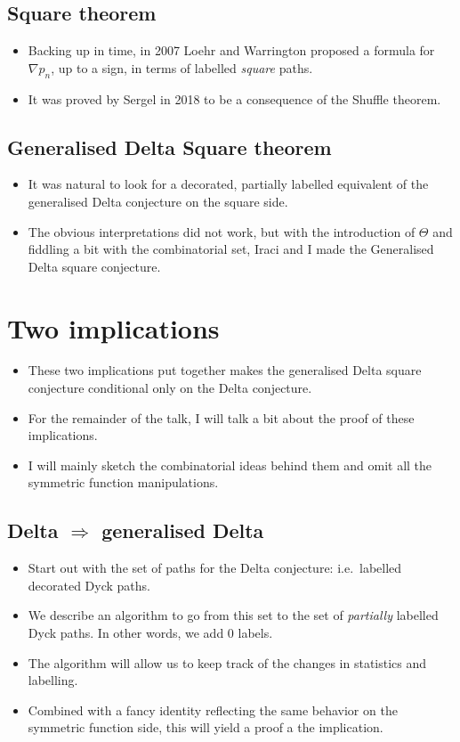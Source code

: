 \documentclass{article}
\begin{document}
\subsection{Square theorem}
\begin{itemize}
    \item Backing up in time, in 2007 Loehr and Warrington proposed a formula for $\nabla p_n$, up to a sign, in terms of labelled \emph{square} paths.
    \item It was proved by Sergel in 2018 to be a consequence of the Shuffle theorem.
\end{itemize}

\subsection{Generalised Delta Square theorem}
\begin{itemize}
    \item It was natural to look for a decorated, partially labelled equivalent of the generalised Delta conjecture on the square side. 
    \item The obvious interpretations did not work, but with the introduction of $\Theta$ and fiddling a bit with the combinatorial set, Iraci and I made the Generalised Delta square conjecture. 
\end{itemize}

\section{Two implications}
    \begin{itemize}
        \item These two implications put together makes the generalised Delta square conjecture conditional only on the Delta conjecture.
        \item For the remainder of the talk, I will talk a bit about the proof of these implications.
        \item I will mainly sketch the combinatorial ideas behind them and omit all the symmetric function manipulations.
    \end{itemize}

    \subsection{Delta $\Rightarrow$ generalised Delta}
        \begin{itemize}
            \item Start out with the set of paths for the Delta conjecture: i.e.\ labelled decorated Dyck paths. 
            \item We describe an algorithm to go from this set to the set of \emph{partially} labelled Dyck paths. In other words, we add $0$ labels.  
            \item The algorithm will allow us to keep track of the changes in statistics and labelling.
            \item Combined with a fancy identity reflecting the same behavior on the symmetric function side, this will yield a proof a the implication. 
        \end{itemize}
\end{document}
